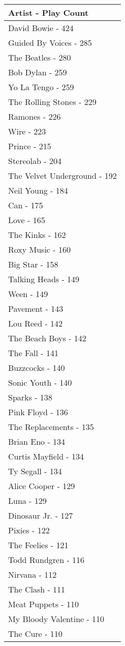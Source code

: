 \documentclass[
]{article}
\begin{document}
\captionsetup[table]{labelformat=empty,skip=1pt}
\begin{longtable}{l}
\toprule
\textbf{Artist - Play Count} \\ 
\midrule
David Bowie - 424 \\ 
Guided By Voices - 285 \\ 
The Beatles - 280 \\ 
Bob Dylan - 259 \\ 
Yo La Tengo - 259 \\ 
The Rolling Stones - 229 \\ 
Ramones - 226 \\ 
Wire - 223 \\ 
Prince - 215 \\ 
Stereolab - 204 \\ 
The Velvet Underground - 192 \\ 
Neil Young - 184 \\ 
Can - 175 \\ 
Love - 165 \\ 
The Kinks - 162 \\ 
Roxy Music - 160 \\ 
Big Star - 158 \\ 
Talking Heads - 149 \\ 
Ween - 149 \\ 
Pavement - 143 \\ 
Lou Reed - 142 \\ 
The Beach Boys - 142 \\ 
The Fall - 141 \\ 
Buzzcocks - 140 \\ 
Sonic Youth - 140 \\ 
Sparks - 138 \\ 
Pink Floyd - 136 \\ 
The Replacements - 135 \\ 
Brian Eno - 134 \\ 
Curtis Mayfield - 134 \\ 
Ty Segall - 134 \\ 
Alice Cooper - 129 \\ 
Luna - 129 \\ 
Dinosaur Jr. - 127 \\ 
Pixies - 122 \\ 
The Feelies - 121 \\ 
Todd Rundgren - 116 \\ 
Nirvana - 112 \\ 
The Clash - 111 \\ 
Meat Puppets - 110 \\ 
My Bloody Valentine - 110 \\ 
The Cure - 110 \\ 
 \bottomrule
\end{longtable}
\end{document}
